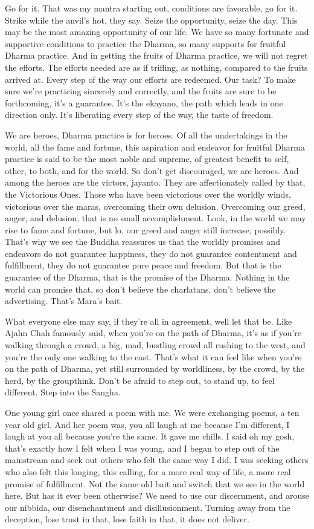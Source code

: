 \documentclass[12pt,openany]{book}
\begin{document}
Go for it. That was my mantra starting out, conditions are favorable, go for it. Strike while the anvil’s hot, they say. Seize the opportunity, seize the day. This may be the most amazing opportunity of our life. We have so many fortunate and supportive conditions to practice the Dhar\-ma, so many supports for fruitful Dhar\-ma practice. And in getting the fruits of Dhar\-ma practice, we will not regret the efforts. The efforts needed are as if trifling, as nothing, compared to the fruits arrived at. Every step of the way our efforts are redeemed. Our task? To make sure we're practicing sincerely and correctly, and the fruits are sure to be forthcoming, it's a guarantee. It’s the ekayano, the path which leads in one direction only. It’s liberating every step of the way, the taste of freedom.

We are heroes, Dhar\-ma practice is for heroes. Of all the undertakings in the world, all the fame and fortune, this aspiration and endeavor for fruitful Dhar\-ma practice is said to be the most noble and supreme, of greatest benefit to self, other, to both, and for the world. So don't get discouraged, we are heroes. And among the heroes are the victors, jayanto. They are affectionately called by that, the Victorious Ones. Those who have been victorious over the worldly winds, victorious over the maras, overcoming their own delusion. Overcoming our greed, anger, and delusion, that is no small accomplishment. Look, in the world we may rise to fame and fortune, but lo, our greed and anger still increase, possibly. That's why we see the Buddha reassures us that the worldly promises and endeavors do not guarantee happiness, they do not guarantee contentment and fulfillment, they do not guarantee pure peace and freedom. But that is the guarantee of the Dhar\-ma, that is the promise of the Dhar\-ma. Nothing in the world can promise that, so don't believe the charlatans, don’t believe the advertising. That’s Mara's bait.

What everyone else may say, if they're all in agreement, well let that be. Like Ajahn Chah famously said, when you're on the path of Dhar\-ma, it’s as if you're walking through a crowd, a big, mad, bust\-ling crowd all rushing to the west, and you're the only one walking to the east. That's what it can feel like when you're on the path of Dhar\-ma, yet still surrounded by worldliness, by the crowd, by the herd, by the groupthink. Don't be afraid to step out, to stand up, to feel different. Step into the Sangha.

One young girl once shared a poem with me. We were exchanging poems, a ten year old girl. And her poem was, you all laugh at me because I'm different, I laugh at you all because you're the same. It gave me chills. I said oh my gosh, that's exactly how I felt when I was young, and I began to step out of the mainstream and seek out others who felt the same way I did. I was seeking others who also felt this longing, this calling, for a more real way of life, a more real promise of fulfillment. Not the same old bait and switch that we see in the world here. But has it ever been otherwise? We need to use our discernment, and arouse our nibbida, our disenchantment and disillusionment. Turning away from the deception, lose trust in that, lose faith in that, it does not deliver.
\end{document}
